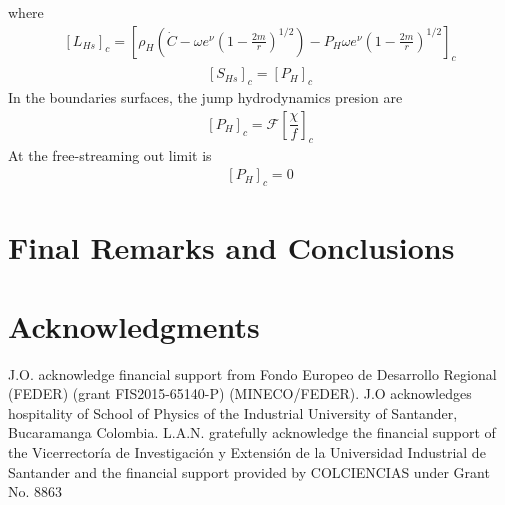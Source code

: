 \documentclass[notitlepage,letterpaper, 10pt]{article}
\begin{document}
where
\begin{eqnarray*}
\left[ L_{Hs} \right]_{c}=\left[ \rho_{H}\left(  \dot{C}- \omega e^{\nu}\left(1-\frac{2m}{r} \right)^{1/2}\right) - P_{H}\omega e^{\nu}\left(1-\frac{2m}{r} \right)^{1/2}\right]_{c}
\end{eqnarray*}
\begin{eqnarray*}
\left[S_{Hs} \right]_{c}= \left[P_{H} \right]_{c}
\end{eqnarray*}
In the boundaries surfaces, the jump hydrodynamics presion are
\begin{eqnarray}
\left[P_{H} \right]_{c}= \mathcal{F}\left[\dfrac{\chi}{f} \right]_{c}
\end{eqnarray}
At the free-streaming out limit is
\begin{eqnarray}
\left[ P_{H}\right]_{c}=0
\end{eqnarray}
\section{Final Remarks and Conclusions}

\section*{Acknowledgments}
J.O. acknowledge financial support from Fondo Europeo de Desarrollo
Regional (FEDER) (grant FIS2015-65140-P) (MINECO/FEDER). J.O acknowledges hospitality of School of Physics of the Industrial University of Santander, Bucaramanga Colombia. L.A.N. gratefully acknowledge the financial support of the Vicerrector\'ia de Investigaci\'on y Extensi\'on de la Universidad Industrial de  Santander and the financial support provided by COLCIENCIAS under Grant No. 8863   



\end{document}
